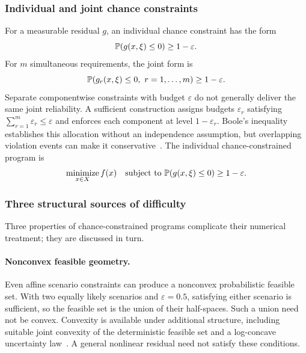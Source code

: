 \subsubsection{Individual and joint chance constraints}\label{ssec:definitions}
For a measurable residual $g$, an individual chance constraint has the form
\begin{equation}
  \mathbb{P}(g(x,\xi)\le0)\ge1-\varepsilon.
  \label{eq:icc}
\end{equation}
For $m$ simultaneous requirements, the joint form is
\begin{equation}
  \Prob(g_r(x,\xi)\le0,\ r=1,\ldots,m)\ge1-\varepsilon.
  \label{eq:jcc}
\end{equation}
Separate componentwise constraints with budget $\varepsilon$ do not generally deliver the same joint reliability. A sufficient construction assigns budgets $\varepsilon_r$ satisfying $\sum_{r=1}^m\varepsilon_r\le\varepsilon$ and enforces each component at level $1-\varepsilon_r$. Boole's inequality establishes this allocation without an independence assumption, but overlapping violation events can make it conservative~\citep{prekopa1995}. The individual chance-constrained program is
\begin{equation}
  \operatorname*{minimize}_{x\in X}f(x)
  \quad\text{subject to }\mathbb{P}(g(x,\xi)\le0)\ge1-\varepsilon.
  \label{eq:ccp}
\end{equation}

\subsubsection{Three structural sources of difficulty}\label{ssec:difficulties}
Three properties of chance-constrained programs complicate their numerical treatment; they are discussed in turn.

\paragraph*{Nonconvex feasible geometry.}
Even affine scenario constraints can produce a nonconvex probabilistic feasible set. With two equally likely scenarios and $\varepsilon=0.5$, satisfying either scenario is sufficient, so the feasible set is the union of their half-spaces. Such a union need not be convex. Convexity is available under additional structure, including suitable joint convexity of the deterministic feasible set and a log-concave uncertainty law~\citep{prekopa1995}. A general nonlinear residual need not satisfy these conditions.

